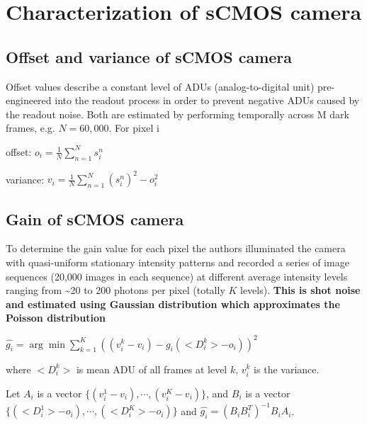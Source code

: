 \documentclass[11pt]{article}
\begin{document}
    \section{Characterization of sCMOS
camera}\label{characterization-of-scmos-camera}

\subsection{Offset and variance of sCMOS
camera}\label{offset-and-variance-of-scmos-camera}

Offset values describe a constant level of ADUs (analog-to-digital unit)
pre-engineered into the readout process in order to prevent negative
ADUs caused by the readout noise. Both are estimated by performing
temporally across M dark frames, e.g. \(N = 60,000\). For pixel i

offset: \(o_i = \frac{1}{N}\sum_{n=1}^{N}s_i^n\)

variance: \(v_i = \frac{1}{N}\sum_{n=1}^{N}(s_i^n)^2-o_i^2\)

\subsection{Gain of sCMOS camera}\label{gain-of-scmos-camera}

To determine the gain value for each pixel the authors illuminated the
camera with quasi-uniform stationary intensity patterns and recorded a
series of image sequences (20,000 images in each sequence) at different
average intensity levels ranging from \textasciitilde{}20 to 200 photons
per pixel (totally \(K\) levels). \textbf{This is shot noise and
estimated using Gaussian distribution which approximates the Poisson
distribution}

\(\hat{g_i} = \arg \min \sum_{k=1}^K((v_i^k-v_i)-g_i(<D_i^k>-o_i))^2\)

where \(<D_i^k>\) is mean ADU of all frames at level \(k\), \(v_i^k\) is
the variance.

Let \(A_i\) is a vector \(\{(v_i^1 - v_i), \cdots, (v_i^K - v_i)\}\),
and \(B_i\) is a vector \(\{(<D_i^1> - o_i), \cdots, (<D_i^K> - o_i)\}\)
and \(\hat{g_i} = (B_i B_i^T)^{-1}B_i A_i\).
\end{document}
